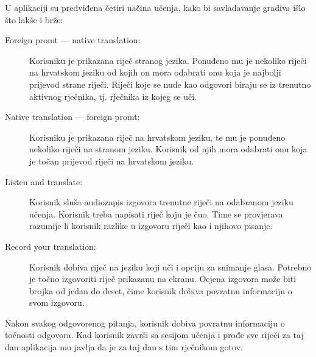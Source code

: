 U aplikaciji su predviđena četiri načina učenja, kako bi savladavanje gradiva išlo što lakše i brže:
\begin{description}
	\item[Foreign promt --- native translation:] Korisniku je prikazana riječ stranog jezika. Ponuđeno mu je nekoliko riječi na hrvatskom jeziku od kojih on mora odabrati onu koja je najbolji prijevod strane riječi. Riječi koje se nude kao odgovori biraju se iz trenutno aktivnog rječnika, tj. rječnika iz kojeg se uči. 
	\item[Native translation --- foreign promt:] Korisniku je prikazana riječ na hrvatskom jeziku, te mu je ponuđeno nekoliko riječi na stranom jeziku. Korisnik od njih mora odabrati onu koja je točan prijevod riječi na hrvatskom jeziku.
	\item[Listen and translate:] Korisnik sluša audiozapis izgovora trenutne riječi na odabranom jeziku učenja. Korisnik treba napisati riječ koju je čuo. Time se provjerava razumije li korisnik razlike u izgovoru riječi kao i njihovo pisanje.
	\item[Record your translation:] Korisnik dobiva riječ na jeziku koji uči i opciju za snimanje glasa. Potrebno je točno izgovoriti riječ prikazanu na ekranu. Ocjena izgovora može biti brojka od jedan do deset, čime korisnik dobiva povratnu informaciju o svom izgovoru.
\end{description}

Nakon svakog odgovorenog pitanja, korisnik dobiva povratnu informaciju o točnosti odgovora. Kad korisnik završi sa sesijom učenja i prođe sve riječi za taj dan aplikacija mu javlja da je za taj dan s tim rječnikom gotov. 

\eject
